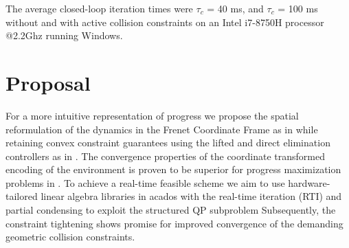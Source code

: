 \documentclass[conference]{IEEEtran}
\begin{document}
The average closed-loop iteration times were $\tau_{c}$ = 40 ms, and $\tau_{c}$ = 100 ms without and with active collision constraints on an Intel i7-8750H processor @2.2Ghz running Windows.
\section{Proposal}\label{Section7}
\par For a more intuitive representation of progress we propose the spatial reformulation of the dynamics in the Frenet Coordinate Frame as in \cite{arrizabalaga_towards_2022} while retaining convex constraint guarantees using the lifted and direct elimination controllers as in \cite{reiter_frenet-cartesian_2023}. The convergence properties of the coordinate transformed encoding of the environment is proven to be superior for progress maximization problems in \cite{werling_invariant_2010}.
To achieve a real-time feasible scheme we aim to use hardware-tailored linear algebra libraries \cite{frison_blasfeo_2018} in acados \cite{verschueren_acados_2020} with the real-time iteration \cite{gros_linear_2020} (RTI) and partial condensing to exploit the structured QP subproblem \cite{frison_hpipm_2020}
Subsequently, the constraint tightening shows promise for improved convergence of the demanding geometric collision constraints.


\end{document}
